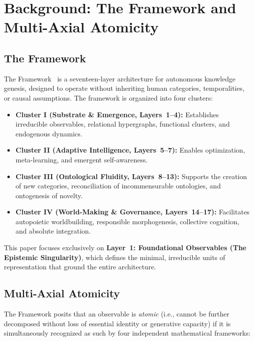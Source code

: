 \newpage
\section{Background: The \Apeiron{} Framework and Multi-Axial Atomicity}

\subsection{The \Apeiron{} Framework}

The \Apeiron{} Framework~\cite{beniers2026apeiron} is a seventeen-layer architecture for autonomous knowledge genesis, designed to operate without inheriting human categories, temporalities, or causal assumptions. The framework is organized into four clusters:
\begin{itemize}
    \item \textbf{Cluster I (Substrate \& Emergence, Layers~1--4):} Establishes irreducible observables, relational hypergraphs, functional clusters, and endogenous dynamics.
    \item \textbf{Cluster II (Adaptive Intelligence, Layers~5--7):} Enables optimization, meta-learning, and emergent self-awareness.
    \item \textbf{Cluster III (Ontological Fluidity, Layers~8--13):} Supports the creation of new categories, reconciliation of incommensurable ontologies, and ontogenesis of novelty.
    \item \textbf{Cluster IV (World-Making \& Governance, Layers~14--17):} Facilitates autopoietic worldbuilding, responsible morphogenesis, collective cognition, and absolute integration.
\end{itemize}

This paper focuses exclusively on \textbf{Layer~1: Foundational Observables (The Epistemic Singularity)}, which defines the minimal, irreducible units of representation that ground the entire architecture.

\subsection{Multi-Axial Atomicity}

The \Apeiron{} Framework posits that an observable is \textit{atomic} (i.e., cannot be further decomposed without loss of essential identity or generative capacity) if it is simultaneously recognized as such by four independent mathematical frameworks:

